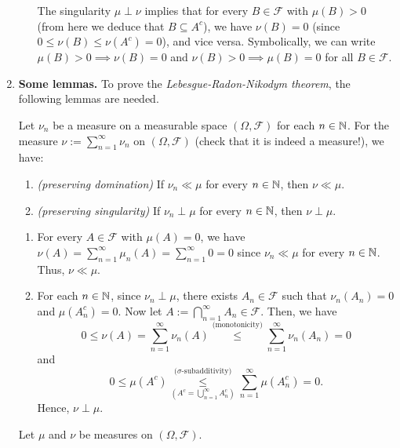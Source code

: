 \begin{enumerate}
\begin{itemize}
\begin{note}
The singularity \(\mu\perp\nu\) implies that for every \(B\in\mathcal{F}\) with
\(\mu(B)>0\) (from here we deduce that \(B\subseteq A^c\)), we have
\(\nu(B)=0\) (since \(0\le\nu(B)\le\nu(A^c)=0\)), and vice versa. Symbolically,
we can write \(\mu(B)>0\implies \nu(B)=0\) and \(\nu(B)>0\implies \mu(B)=0\) for
all \(B\in\mathcal{F}\).
\end{note}
\end{itemize}
\item \textbf{Some lemmas.} To prove the \emph{Lebesgue-Radon-Nikodym theorem},
the following lemmas are needed.
\begin{lemma}
\label{lma:meas-sum-dom-sing}
Let \(\nu_n\) be a measure on a measurable space \((\Omega,\mathcal{F})\) for
each \(n\in\mathbb{N}\). For the measure \(\nu:=\sum_{n=1}^{\infty}\nu_n\) on
\((\Omega,\mathcal{F})\) (check that it is indeed a measure!), we have:
\begin{enumerate}
\item \emph{(preserving domination)} If \(\nu_n\ll \mu\) for every \(n\in\mathbb{N}\), then \(\nu\ll\mu\).
\item \emph{(preserving singularity)} If \(\nu_n\perp\mu\) for every
\(n\in\mathbb{N}\), then \(\nu\perp\mu\).
\end{enumerate}
\end{lemma}
\begin{pf}
\begin{enumerate}
\item For every \(A\in\mathcal{F}\) with \(\mu(A)=0\), we have \(\nu(A)=\sum_{n=1}^{\infty}\mu_n(A)=
\sum_{n=1}^{\infty}0=0\) since \(\nu_n\ll\mu\) for every \(n\in\mathbb{N}\). Thus, \(\nu\ll\mu\).
\item For each \(n\in\mathbb{N}\), since \(\nu_n\perp\mu\), there exists
\(A_n\in\mathcal{F}\) such that \(\nu_n(A_n)=0\) and \(\mu(A_n^{c})=0\). Now
let \(A:=\bigcap_{n=1}^{\infty}A_n\in\mathcal{F}\). Then, we have
\[
0\le\nu(A)=\sum_{n=1}^{\infty}\nu_n(A)\overset{\text{(monotonicity)}}{\le}
\sum_{n=1}^{\infty}\nu_n(A_n)=0
\]
and
\[
0\le\mu(A^{c})\underset{(A^c=\bigcup_{n=1}^{\infty}A_n^{c})}{\overset{\text{(\(\sigma\)-subadditivity)}}{\le}}
\sum_{n=1}^{\infty}\mu(A_n^c)=0.
\]
Hence, \(\nu\perp\mu\).
\end{enumerate}
\end{pf}
\begin{lemma}
\label{lma:fin-meas-relate}
Let \(\mu\) and \(\nu\) be  measures on \((\Omega,\mathcal{F})\).

\end{lemma}
\end{enumerate}
